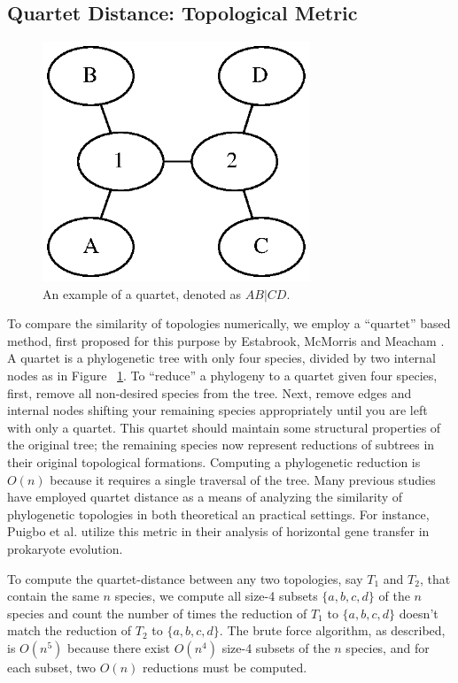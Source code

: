 \documentclass[10pt,twocolumn]{article}
\begin{document}
\subsection*{Quartet Distance: Topological Metric}
\begin{figure}
\begin{centering}
  \includegraphics[width=80mm]{media/quartet.eps}
  \caption{An example of a quartet, denoted as $AB|CD$.}
  \label{fig:quartet}
\end{centering}
\end{figure}
To compare the similarity of topologies numerically, we employ a ``quartet'' based method, first proposed for this purpose by Estabrook, McMorris and Meacham \cite{estabrook1985comparison}. A quartet is a phylogenetic tree with only four species, divided by two internal nodes as in Figure ~\ref{fig:quartet}. To ``reduce'' a phylogeny to a quartet given four species, first, remove all non-desired species from the tree. Next, remove edges and internal nodes shifting your remaining species appropriately until you are left with only a quartet. This quartet should maintain some structural properties of the original tree; the remaining species now represent reductions of subtrees in their original topological formations. Computing a phylogenetic reduction is $O(n)$ because it requires a single traversal of the tree. Many previous studies have employed quartet distance as a means of analyzing the similarity of phylogenetic topologies in both theoretical an practical settings. For instance, Puigbo et al. \cite{puigbo2010tree} utilize this metric in their analysis of horizontal gene transfer in prokaryote evolution.

To compute the quartet-distance between any two topologies, say $T_1$ and $T_2$, that contain the same $n$ species, we compute all size-4 subsets $\{a,b,c,d\}$ of the $n$ species and count the number of times the reduction of $T_1$ to $\{a,b,c,d\}$ doesn't match the reduction of $T_2$ to $\{a,b,c,d\}$. The brute force algorithm, as described, is $O(n^5)$ because there exist $O(n^4)$ size-4 subsets of the $n$ species, and for each subset, two $O(n)$ reductions must be computed.
\end{document}
